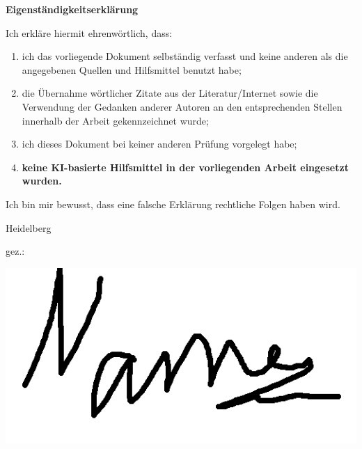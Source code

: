 
{\cleardoublepage%
\let\clearpage\relax%

\LARGE
\noindent
\textbf{Eigenständigkeitserklärung}
\vspace{1.0cm}
}

\noindent
Ich erkläre hiermit ehrenwörtlich, dass:
\begin{enumerate}
    \item{ich das vorliegende Dokument selbständig verfasst und keine anderen als die angegebenen Quellen und Hilfsmittel benutzt habe;}
    \item{die Übernahme wörtlicher Zitate aus der Literatur/Internet sowie die Verwendung der Gedanken anderer Autoren an den entsprechenden Stellen innerhalb der Arbeit gekennzeichnet wurde;}
    \item{ich dieses Dokument bei keiner anderen Prüfung vorgelegt habe;}
    \item{\textbf{keine KI-basierte Hilfsmittel in der vorliegenden Arbeit eingesetzt wurden.}}
\end{enumerate}
Ich bin mir bewusst, dass eine falsche Erklärung rechtliche Folgen haben wird. 

\par
\vspace{10mm}
\noindent
Heidelberg \mydate
\par
\vspace{12mm}
\noindent
gez.:

\includegraphics[scale=0.2]{rattenschwanz/signature.png}

